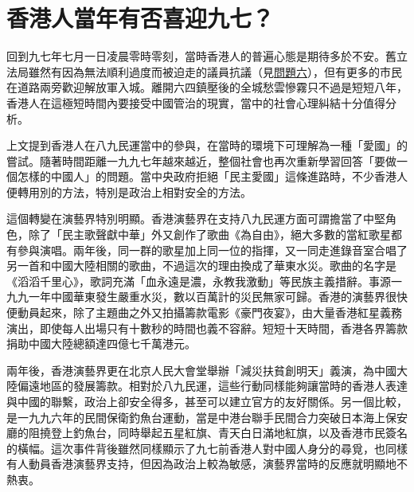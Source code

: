 \section{香港人當年有否喜迎九七？}
\label{sec:sec7}

回到九七年七月一日凌晨零時零刻，當時香港人的普遍心態是期待多於不安。舊立法局雖然有因為無法順利過度而被迫走的議員抗議（見\hyperref[sec:sec6]{問題六}），但有更多的市民在道路兩旁歡迎解放軍入城。離開六四鎮壓後的全城愁雲慘霧只不過是短短八年，香港人在這極短時間內要接受中國管治的現實，當中的社會心理糾結十分值得分析。

上文提到香港人在八九民運當中的參與，在當時的環境下可理解為一種「愛國」的嘗試。隨著時間距離一九九七年越來越近，整個社會也再次重新學習回答「要做一個怎樣的中國人」的問題。當中央政府拒絕「民主愛國」這條進路時，不少香港人便轉用別的方法，特別是政治上相對安全的方法。

這個轉變在演藝界特別明顯。香港演藝界在支持八九民運方面可謂擔當了中堅角色，除了「民主歌聲獻中華」外又創作了歌曲《為自由》，絕大多數的當紅歌星都有參與演唱。兩年後，同一群的歌星加上同一位的指揮，又一同走進錄音室合唱了另一首和中國大陸相關的歌曲，不過這次的理由換成了華東水災。歌曲的名字是《滔滔千里心》，歌詞充滿「血永遠是濃，永教我激動」等民族主義措辭。事源一九九一年中國華東發生嚴重水災，數以百萬計的災民無家可歸。香港的演藝界很快便動員起來，除了主題曲之外又拍攝籌款電影《豪門夜宴》，由大量香港紅星義務演出，即使每人出場只有十數秒的時間也義不容辭。短短十天時間，香港各界籌款捐助中國大陸總額達四億七千萬港元。


兩年後，香港演藝界更在北京人民大會堂舉辦「減災扶貧創明天」義演，為中國大陸偏遠地區的發展籌款。相對於八九民運，這些行動同樣能夠讓當時的香港人表達與中國的聯繫，政治上卻安全得多，甚至可以建立官方的友好關係。另一個比較，是一九九六年的民間保衛釣魚台運動，當是中港台聯手民間合力突破日本海上保安廳的阻撓登上釣魚台，同時舉起五星紅旗、青天白日滿地紅旗，以及香港市民簽名的橫幅。這次事件背後雖然同樣顯示了九七前香港人對中國人身分的尋覓，也同樣有人動員香港演藝界支持，但因為政治上較為敏感，演藝界當時的反應就明顯地不熱衷。

